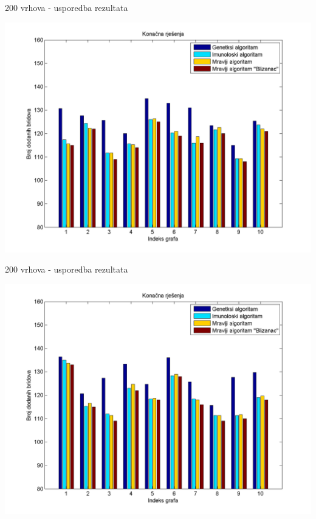 \documentclass{beamer}
\begin{document}
\begin{frame}{200 vrhova - usporedba rezultata}
\begin{center}
\includegraphics[scale = 0.45]{prvih10.png}\\
\end{center}
\end{frame}

\begin{frame}{200 vrhova - usporedba rezultata}
\begin{center}
\includegraphics[scale = 0.45]{drugih10.png}\\
\end{center}
\end{frame}
\end{document}
